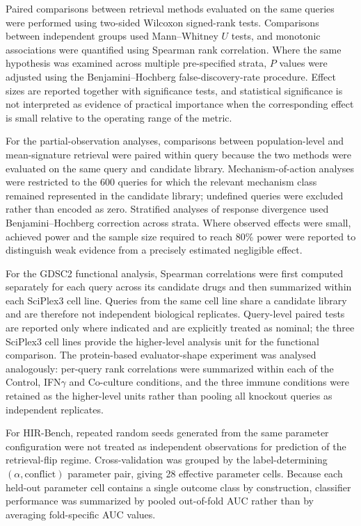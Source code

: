 \documentclass[11pt,letterpaper]{article}
\begin{document}
Paired comparisons between retrieval methods evaluated on the same queries were performed using
two-sided Wilcoxon signed-rank tests. Comparisons between independent groups used Mann--Whitney
$U$ tests, and monotonic associations were quantified using Spearman rank correlation. Where the
same hypothesis was examined across multiple pre-specified strata, $P$ values were adjusted using
the Benjamini--Hochberg false-discovery-rate procedure\cite{BenjaminiHochberg}. Effect sizes are
reported together with significance tests, and statistical significance is not interpreted as
evidence of practical importance when the corresponding effect is small relative to the operating
range of the metric.

For the partial-observation analyses, comparisons between population-level and mean-signature
retrieval were paired within query because the two methods were evaluated on the same query and
candidate library. Mechanism-of-action analyses were restricted to the 600 queries for which the
relevant mechanism class remained represented in the candidate library; undefined queries were
excluded rather than encoded as zero. Stratified analyses of response divergence used
Benjamini--Hochberg correction across strata. Where observed effects were small, achieved power and
the sample size required to reach 80\% power were reported to distinguish weak evidence from a
precisely estimated negligible effect.

For the GDSC2 functional analysis, Spearman correlations were first computed separately for each
query across its candidate drugs and then summarized within each SciPlex3 cell line. Queries from
the same cell line share a candidate library and are therefore not independent biological
replicates. Query-level paired tests are reported only where indicated and are explicitly treated
as nominal; the three SciPlex3 cell lines provide the higher-level analysis unit for the
functional comparison. The protein-based evaluator-shape experiment was analysed analogously:
per-query rank correlations were summarized within each of the Control, IFN$\gamma$ and
Co-culture conditions, and the three immune conditions were retained as the higher-level units
rather than pooling all knockout queries as independent replicates.

For HIR-Bench, repeated random seeds generated from the same parameter configuration were not
treated as independent observations for prediction of the retrieval-flip regime. Cross-validation
was grouped by the label-determining $(\alpha,\mathrm{conflict})$ parameter pair, giving 28
effective parameter cells. Because each held-out parameter cell contains a single outcome class by
construction, classifier performance was summarized by pooled out-of-fold AUC rather than by
averaging fold-specific AUC values.
\end{document}

